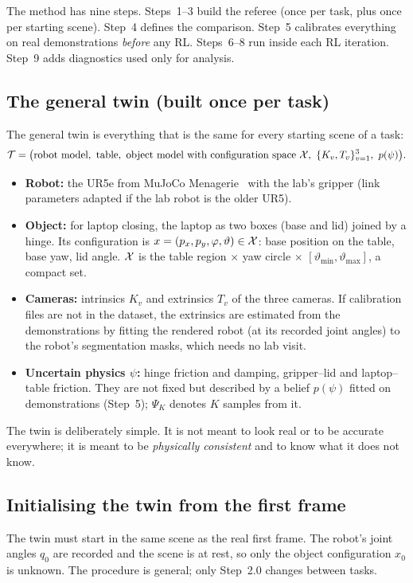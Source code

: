 The method has nine steps. Steps~1--3 build the referee (once per task, plus once per starting scene). Step~4 defines the comparison. Step~5 calibrates everything on real demonstrations \emph{before} any RL. Steps~6--8 run inside each RL iteration. Step~9 adds diagnostics used only for analysis.

\subsection{The general twin (built once per task)}\label{method:sec:twin}
The general twin is everything that is the same for every starting scene of a task:
\begin{equation}
\mathcal T=\big(\text{robot model},\ \text{table},\ \text{object model with configuration space }\X,\ \{K_v,T_v\}_{v=1}^{3},\ p(\psi)\big).
\end{equation}
\begin{itemize}
\item \textbf{Robot:} the UR5e from MuJoCo Menagerie~\cite{menagerie} with the lab's gripper (link parameters adapted if the lab robot is the older UR5).
\item \textbf{Object:} for laptop closing, the laptop as two boxes (base and lid) joined by a hinge. Its configuration is $x=(p_x,p_y,\varphi,\vartheta)\in\mathcal X$: base position on the table, base yaw, lid angle. $\mathcal X$ is the table region $\times$ yaw circle $\times$ $[\vartheta_{\min},\vartheta_{\max}]$, a compact set.
\item \textbf{Cameras:} intrinsics $K_v$ and extrinsics $T_v$ of the three cameras. If calibration files are not in the dataset, the extrinsics are estimated from the demonstrations by fitting the rendered robot (at its recorded joint angles) to the robot's segmentation masks, which needs no lab visit.
\item \textbf{Uncertain physics $\psi$:} hinge friction and damping, gripper--lid and laptop--table friction. They are not fixed but described by a belief $p(\psi)$ fitted on demonstrations (Step~5); $\Psi_K$ denotes $K$ samples from it.
\end{itemize}
The twin is deliberately simple. It is not meant to look real or to be accurate everywhere; it is meant to be \emph{physically consistent} and to know what it does not know.

\subsection{Initialising the twin from the first frame}\label{method:sec:init}
The twin must start in the same scene as the real first frame. The robot's joint angles $q_0$ are recorded and the scene is at rest, so only the object configuration $x_0$ is unknown. The procedure is general; only Step~2.0 changes between tasks.

